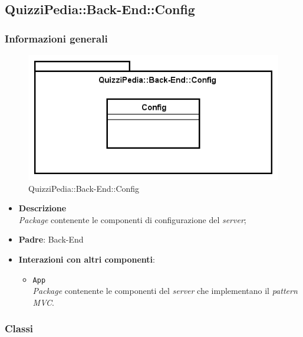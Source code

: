 \subsection{QuizziPedia::Back-End::Config}
\subsubsection{Informazioni generali}
\label{QuizziPedia::Back-End::Config}
\begin{figure}[ht]
	\centering
	\includegraphics[scale=0.45]{UML/Package/QuizziPedia_Back-End_Config.png}
	\caption{QuizziPedia::Back-End::Config}
\end{figure}
\FloatBarrier
	\begin{itemize}
		\item \textbf{Descrizione} \\
		\textit{Package} contenente le componenti di configurazione del \textit{server};
		\item \textbf{Padre}: Back-End
		\item \textbf{Interazioni con altri componenti}:
			\begin{itemize}
				\item \texttt{App} \\
				\textit{Package} contenente le componenti del \textit{server} che implementano il \textit{pattern MVC}.
			\end{itemize}
	\end{itemize}
\subsubsection{Classi}
